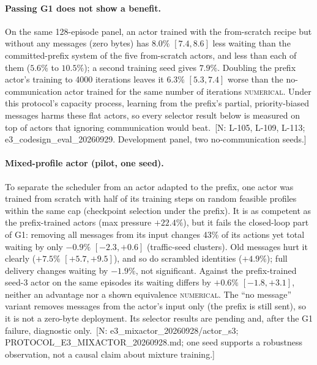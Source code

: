 \documentclass[11pt]{article}
\theoremstyle{definition}
\newcommand{\NUM}{\textsc{numerical}}
\newif\ifshownotes\shownotestrue
\newcommand{\NOTE}[1]{\ifshownotes{\color{notecol}\,\textsf{\footnotesize[N: #1]}}\fi}
\begin{document}
\paragraph{Passing G1 does not show a benefit.} On the same 128-episode panel, an actor trained with the
from-scratch recipe but without any messages (zero bytes) has $8.0\%$ $[7.4, 8.6]$ less waiting than the
committed-prefix system of the five from-scratch actors, and less than each of them ($5.6\%$ to $10.5\%$); a
second training seed gives $7.9\%$. Doubling the prefix actor's training to 4000 iterations leaves it $6.3\%$
$[5.3, 7.4]$ worse than the no-communication actor trained for the same number of iterations \NUM. Under this
protocol's capacity process, learning from the prefix's partial, priority-biased messages harms these flat
actors, so every selector result below is measured on top of actors that ignoring communication would beat.
\NOTE{L-105, L-109, L-113; e3\_codesign\_eval\_20260929. Development panel, two no-communication seeds.}

\paragraph{Mixed-profile actor (pilot, one seed).} To separate the scheduler from an actor adapted to
the prefix, one actor was trained from scratch with half of its training steps on random feasible
profiles within the same cap (checkpoint selection under the prefix). It is as competent as the
prefix-trained actors (max pressure $+22.4\%$), but it fails the closed-loop part of G1: removing all
messages from its input changes 43\% of its actions yet total waiting by only $-0.9\%$ $[-2.3,+0.6]$
(traffic-seed clusters). Old messages hurt it clearly ($+7.5\%$ $[+5.7,+9.5]$), and so do scrambled
identities ($+4.9\%$); full delivery changes waiting by $-1.9\%$, not significant. Against the
prefix-trained seed-3 actor on the same episodes its waiting differs by $+0.6\%$ $[-1.8,+3.1]$, neither
an advantage nor a shown equivalence \NUM. The ``no message'' variant removes messages from the actor's
input only (the prefix is still sent), so it is not a zero-byte deployment. Its selector results are
pending and, after the G1 failure, diagnostic only.
\NOTE{e3\_mixactor\_20260928/actor\_s3; PROTOCOL\_E3\_MIXACTOR\_20260928.md; one seed supports a
robustness observation, not a causal claim about mixture training.}
\end{document}
